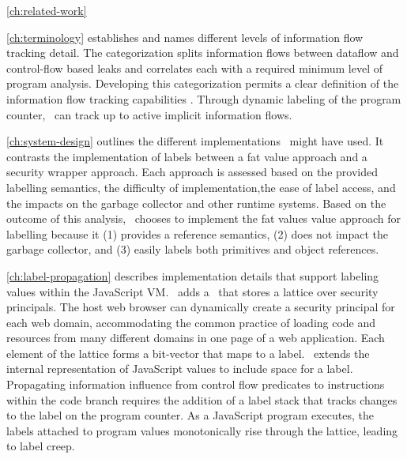 \autoref{ch:related-work} 

\autoref{ch:terminology} establishes and names different levels of information flow tracking detail.
The categorization splits information flows between dataflow and control-flow based leaks and correlates each with a required minimum level of program analysis.
Developing this categorization permits a clear definition of the information flow tracking capabilities \FlowCore.
Through dynamic labeling of the program counter, \FlowCore\ can track up to active implicit information flows.

\autoref{ch:system-design} outlines the different implementations \FlowCore\ might have used.
It contrasts the implementation of labels between a fat value approach and a security wrapper approach.
Each approach is assessed based on the provided labelling semantics, the difficulty of implementation,the ease of label access, and the impacts on the garbage collector and other runtime systems.
Based on the outcome of this analysis, \FlowCore\ chooses to implement the fat values value approach for labelling because it (1) provides a reference semantics, (2) does not impact the garbage collector, and (3) easily labels both primitives and object references.

\autoref{ch:label-propagation} describes implementation details that support labeling values within the JavaScript VM.
\FlowCore\ adds a \FlowLabelRegistry\ that stores a lattice over security principals.
The host web browser can dynamically create a security principal for each web domain, accommodating the common practice of loading code and resources from many different domains in one page of a web application.
Each element of the lattice forms a bit-vector that maps to a label.
\FlowCore\ extends the internal representation of JavaScript values to include space for a label.
Propagating information influence from control flow predicates to instructions within the code branch requires the addition of a label stack that tracks changes to the label on the program counter.
As a JavaScript program executes, the labels attached to program values monotonically rise through the lattice, leading to label creep.

